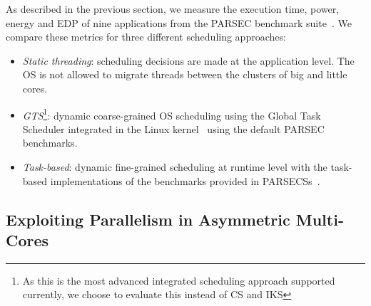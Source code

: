 As described in the previous section, we measure the execution time, power, energy and EDP of nine applications from the PARSEC benchmark suite~\cite{Bienia:PhD2011}. We compare these metrics  for three different scheduling approaches:
\begin{itemize}
\item \textit{Static threading}: scheduling decisions are made at the application level. The OS is not allowed to migrate threads between the clusters of big and little cores. 
\item \textit{GTS}\footnote{As this is the most advanced integrated scheduling approach supported currently, we choose to evaluate this instead of CS and IKS}: dynamic coarse-grained OS scheduling using the Global Task Scheduler integrated in the Linux kernel~\cite{samsung, ARM} using the default PARSEC benchmarks. 
\item \textit{Task-based}: dynamic fine-grained scheduling at runtime level with the task-based implementations of the benchmarks provided in PARSECSs~\cite{Chasapis:TACO2016}.
\end{itemize}


\subsection{Exploiting Parallelism in Asymmetric Multi-Cores}


